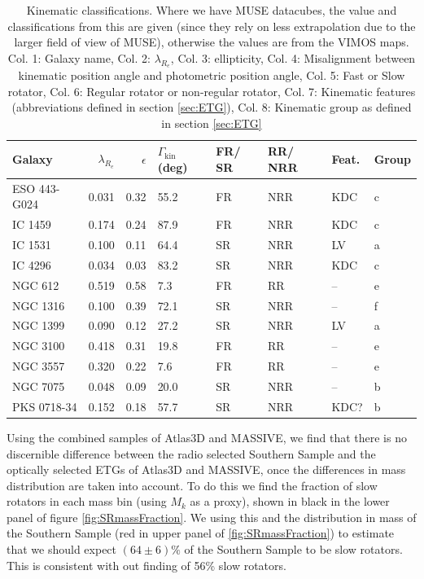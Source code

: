 		\begin{table}
			\centering
			\caption{Kinematic classifications. Where we have MUSE datacubes, the value and classifications from this are given (since they rely on less extrapolation due to the larger field of view of MUSE), otherwise the values are from the VIMOS maps. Col. 1: Galaxy name, Col. 2: $\lambda_{R_e}$, Col. 3: ellipticity, Col. 4: Misalignment between kinematic position angle and photometric position angle, Col. 5: Fast or Slow rotator, Col. 6: Regular rotator or non-regular rotator, Col. 7: Kinematic features (abbreviations defined in section \ref{sec:ETG}), Col. 8: Kinematic group as defined in section \ref{sec:ETG}}
			\label{tab:classify}
			\begin{tabular}{l r r p{0.7cm} p{0.8cm} p{0.8cm} p{1cm} p{1cm}}
				\hline
				\hline
				Galaxy		& $\lambda_{R_e}$ & $\epsilon$  & $\Gamma_\text{kin}$ (deg) & FR/ SR 	& RR/ NRR 	& Feat. & Group 	\\
				\hline 
				ESO 443-G024 & 0.031 & 0.32 & 55.2 	& FR & NRR & KDC & c \\
				IC 1459 	& 0.174 & 0.24 & 87.9	& FR & NRR & KDC & c \\
				IC 1531 	& 0.100 & 0.11 & 64.4 	& SR & NRR & LV & a \\
				IC 4296		& 0.034 & 0.03 & 83.2 	& SR & NRR & KDC & c \\
				NGC 612 	& 0.519 & 0.58 & 7.3 	& FR & RR & -- & e \\
				NGC 1316 	& 0.100 & 0.39 & 72.1 	& SR & NRR & -- & f \\
				NGC 1399 	& 0.090 & 0.12 & 27.2 	& SR & NRR & LV & a \\
				NGC 3100 	& 0.418 & 0.31 & 19.8 	& FR & RR & -- & e \\
				NGC 3557 	& 0.320 & 0.22 & 7.6 	& FR & RR & -- & e\\
				NGC 7075 	& 0.048 & 0.09 & 20.0 	& SR & NRR & -- & b \\
				PKS 0718-34 & 0.152 & 0.18 & 57.7 	& SR & NRR & KDC? & b\\
				\hline
				\hline
			\end{tabular}
		\end{table}


		Using the combined samples of Atlas3D and MASSIVE, we find that there is no discernible difference between the radio selected Southern Sample and the optically selected ETGs of Atlas3D and MASSIVE, once the differences in mass distribution are taken into account. To do this we find the fraction of slow rotators in each mass bin (using $M_k$ as a proxy), shown in black in the lower panel of figure \ref{fig:SRmassFraction}. We using this and the distribution in mass of the Southern Sample (red in upper panel of \ref{fig:SRmassFraction}) to estimate that we should expect $(64 \pm 6)\%$ of the Southern Sample to be slow rotators. This is consistent with out finding of 56\% slow rotators.

